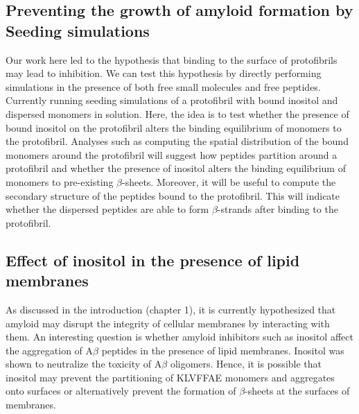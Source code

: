 \subsection{Preventing the growth of amyloid formation by Seeding simulations}
Our work here led to the hypothesis that binding to the surface of protofibrils may lead to inhibition. We can test this hypothesis by directly performing simulations in the presence of both free small molecules and free peptides. Currently running seeding simulations of a protofibril with bound inositol and dispersed monomers in solution. Here, the idea is to test whether the presence of bound inositol on the protofibril alters the binding equilibrium of monomers to the protofibril. 
Analyses such as computing the spatial distribution of the bound monomers around the protofibril will suggest how peptides partition around a protofibril and whether the presence of inositol alters the binding equilibrium of monomers to pre-existing $\beta$-sheets. Moreover, it will be useful to compute the secondary structure of the peptides bound to the protofibril.  This will indicate whether the dispersed peptides are able to form $\beta$-strands after binding to the protofibril.

\subsection{Effect of inositol in the presence of lipid membranes}
As discussed in the introduction (chapter 1), it is currently hypothesized that amyloid may disrupt the integrity of cellular membranes by interacting with them. An interesting question is whether amyloid inhibitors such as inositol affect the aggregation of A$\beta$ peptides in the presence of lipid membranes. Inositol was shown to neutralize the toxicity of A$\beta$ oligomers.\cite{McLaurin:2000bq}  Hence, it is possible that inositol may prevent the partitioning of KLVFFAE monomers and aggregates onto surfaces or alternatively prevent the formation of $\beta$-sheets at the surfaces of membranes.\cite{references}

